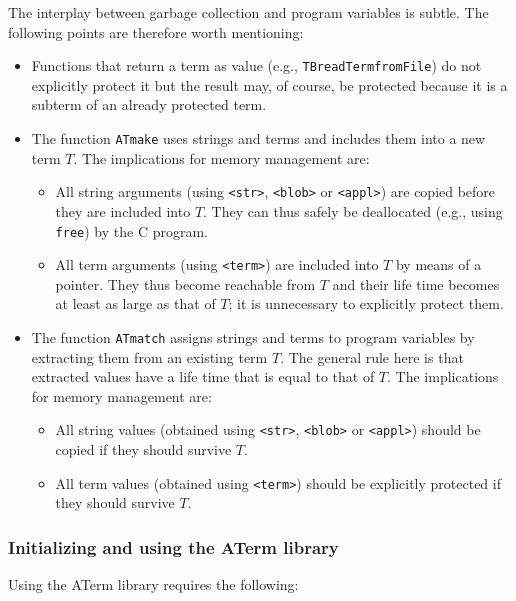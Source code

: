 \documentclass[a4,twoside,noweb]{article} %
\begin{document}
The interplay between garbage collection and program variables
is subtle. The following points are therefore worth  mentioning:

\begin{itemize}

\item Functions that return a term as value (e.g., {\tt TBreadTermfromFile}) 
do not explicitly protect it but the result may, of course, be
protected because it is a subterm of an already protected term.

\item The function {\tt ATmake} uses strings and terms and includes
them into a new term $T$. The implications for memory management are:
\begin{itemize}
\item All string arguments (using {\tt <str>}, {\tt <blob>} or {\tt <appl>})
are copied before they are included into $T$.
They can thus safely be deallocated (e.g., using {\tt free}) by the C program.

\item All term arguments (using {\tt <term>}) are included
into $T$ by means of a pointer.
They thus become reachable from $T$ and
their life time becomes at least as large as that of $T$;
it is unnecessary to explicitly protect them.
\end{itemize}

\item The function {\tt ATmatch} assigns strings and terms to program variables
by extracting them from an existing term $T$. The general rule here is that
extracted values have a life time that is equal to that of $T$.
The implications for memory management are:
\begin{itemize}
\item All string values (obtained using {\tt <str>}, {\tt <blob>} or {\tt <appl>})
should be copied if they should survive $T$.
\item All term values (obtained using {\tt <term>}) should
be explicitly protected if they should survive $T$.
\end{itemize}

\end{itemize}


\subsubsection{Initializing and using the ATerm library}

Using the ATerm library requires the following:
\end{document}
